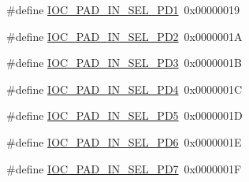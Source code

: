 \begin{DoxyCompactItemize}
\item 
\#define \hyperlink{group__ioc__api_gae8813f984ad05062ff54e1a5399c9c24}{I\+O\+C\+\_\+\+P\+A\+D\+\_\+\+I\+N\+\_\+\+S\+E\+L\+\_\+\+P\+D1}~0x00000019
\item 
\#define \hyperlink{group__ioc__api_ga302356c73b38e941ae87c3a69c2facf9}{I\+O\+C\+\_\+\+P\+A\+D\+\_\+\+I\+N\+\_\+\+S\+E\+L\+\_\+\+P\+D2}~0x0000001A
\item 
\#define \hyperlink{group__ioc__api_ga5d322d895531779a9441399d7070d742}{I\+O\+C\+\_\+\+P\+A\+D\+\_\+\+I\+N\+\_\+\+S\+E\+L\+\_\+\+P\+D3}~0x0000001B
\item 
\#define \hyperlink{group__ioc__api_ga4ae06f728718c475b8424e597fe0e0f3}{I\+O\+C\+\_\+\+P\+A\+D\+\_\+\+I\+N\+\_\+\+S\+E\+L\+\_\+\+P\+D4}~0x0000001C
\item 
\#define \hyperlink{group__ioc__api_ga1f824940fc882be2cd2cffc664a92ab6}{I\+O\+C\+\_\+\+P\+A\+D\+\_\+\+I\+N\+\_\+\+S\+E\+L\+\_\+\+P\+D5}~0x0000001D
\item 
\#define \hyperlink{group__ioc__api_ga996d178f6b7c066d43fdfdefbf6d4e39}{I\+O\+C\+\_\+\+P\+A\+D\+\_\+\+I\+N\+\_\+\+S\+E\+L\+\_\+\+P\+D6}~0x0000001E
\item 
\#define \hyperlink{group__ioc__api_gaac76a9003e489b3056ada8b2fee44c53}{I\+O\+C\+\_\+\+P\+A\+D\+\_\+\+I\+N\+\_\+\+S\+E\+L\+\_\+\+P\+D7}~0x0000001F
\end{DoxyCompactItemize}
